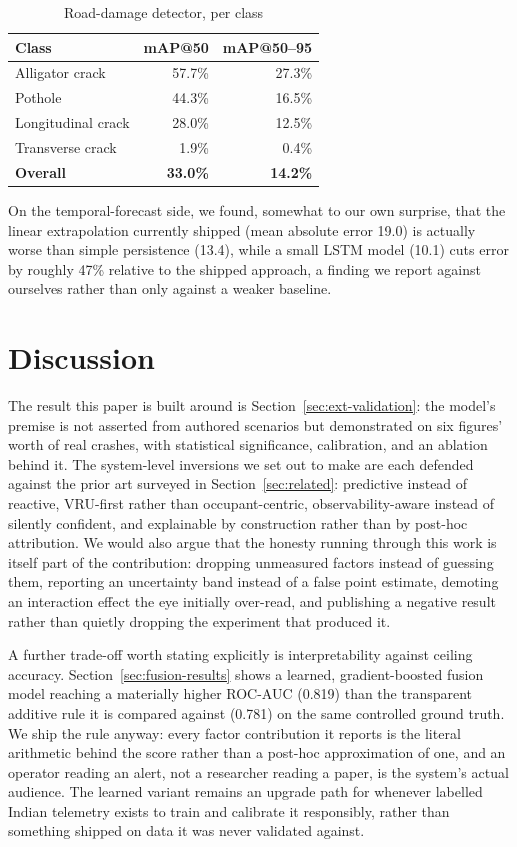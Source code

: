 \documentclass[journal]{IEEEtran}
\begin{document}
\begin{table}[h]
\centering
\caption{Road-damage detector, per class}
\label{tab:damage}
\small
\begin{tabular}{lrr}
\toprule
\textbf{Class} & \textbf{mAP@50} & \textbf{mAP@50--95} \\
\midrule
Alligator crack & 57.7\% & 27.3\% \\
Pothole & 44.3\% & 16.5\% \\
Longitudinal crack & 28.0\% & 12.5\% \\
Transverse crack & 1.9\% & 0.4\% \\
\midrule
\textbf{Overall} & \textbf{33.0\%} & \textbf{14.2\%} \\
\bottomrule
\end{tabular}
\end{table} On the temporal-forecast side, we found, somewhat to our own surprise, that the linear extrapolation currently shipped (mean absolute error 19.0) is actually worse than simple persistence (13.4), while a small LSTM model (10.1) cuts error by roughly 47\% relative to the shipped approach, a finding we report against ourselves rather than only against a weaker baseline.

\section{Discussion}
\label{sec:discussion}

The result this paper is built around is Section~\ref{sec:ext-validation}: the model's premise is not asserted from authored scenarios but demonstrated on six figures' worth of real crashes, with statistical significance, calibration, and an ablation behind it. The system-level inversions we set out to make are each defended against the prior art surveyed in Section~\ref{sec:related}: predictive instead of reactive, VRU-first rather than occupant-centric, observability-aware instead of silently confident, and explainable by construction rather than by post-hoc attribution. We would also argue that the honesty running through this work is itself part of the contribution: dropping unmeasured factors instead of guessing them, reporting an uncertainty band instead of a false point estimate, demoting an interaction effect the eye initially over-read, and publishing a negative result rather than quietly dropping the experiment that produced it.

A further trade-off worth stating explicitly is interpretability against ceiling accuracy. Section~\ref{sec:fusion-results} shows a learned, gradient-boosted fusion model reaching a materially higher ROC-AUC (0.819) than the transparent additive rule it is compared against (0.781) on the same controlled ground truth. We ship the rule anyway: every factor contribution it reports is the literal arithmetic behind the score rather than a post-hoc approximation of one, and an operator reading an alert, not a researcher reading a paper, is the system's actual audience. The learned variant remains an upgrade path for whenever labelled Indian telemetry exists to train and calibrate it responsibly, rather than something shipped on data it was never validated against.
\end{document}
